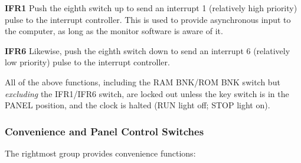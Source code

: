 \documentclass[11pt,a4paper,twocolumns]{article}
\newcommand{\lt}[1]{\textsf{#1}}
\newcommand{\sw}[1]{\textsf{#1}}
\begin{document}
\begin{description}
\item{\bf\sw{IFR1}} Push the eighth switch up to send an interrupt 1
  (relatively high priority) pulse to the interrupt controller. This
  is used to provide asynchronous input to the computer, as long as
  the monitor software is aware of it.
\item{\bf\sw{IFR6}} Likewise, push the eighth switch down to send an
  interrupt 6 (relatively low priority) pulse to the interrupt
  controller.

\end{description}

All of the above functions, including the {\sw{RAM BNK}/\sw{ROM BNK}}
switch but {\em excluding\/} the \sw{IFR1}/\sw{IFR6} switch, are
locked out unless the key switch is in the \sw{PANEL} position, and
the clock is halted (\lt{RUN} light off; \lt{STOP} light on).

\subsubsection{Convenience and Panel Control Switches}

The rightmost group provides convenience functions:
\end{document}

